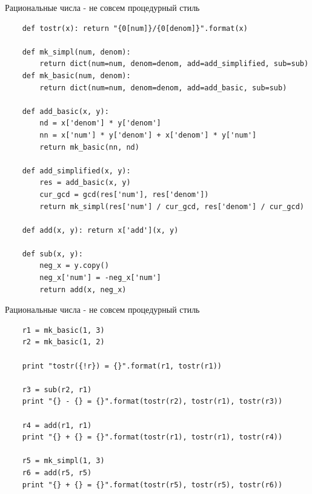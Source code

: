 \documentclass{article}
\begin{document}
\begin{center} Рациональные числа - не совсем процедурный стиль \end{center}
\begin{lstlisting}
    def tostr(x): return "{0[num]}/{0[denom]}".format(x)

    def mk_simpl(num, denom):
        return dict(num=num, denom=denom, add=add_simplified, sub=sub)
    def mk_basic(num, denom):
        return dict(num=num, denom=denom, add=add_basic, sub=sub)

    def add_basic(x, y):
        nd = x['denom'] * y['denom']
        nn = x['num'] * y['denom'] + x['denom'] * y['num']
        return mk_basic(nn, nd)

    def add_simplified(x, y):
        res = add_basic(x, y)
        cur_gcd = gcd(res['num'], res['denom'])
        return mk_simpl(res['num'] / cur_gcd, res['denom'] / cur_gcd)

    def add(x, y): return x['add'](x, y)

    def sub(x, y):
        neg_x = y.copy()
        neg_x['num'] = -neg_x['num']
        return add(x, neg_x)
\end{lstlisting}
\newpage

\begin{center} Рациональные числа - не совсем процедурный стиль \end{center}
\begin{lstlisting}
    r1 = mk_basic(1, 3)
    r2 = mk_basic(1, 2)

    print "tostr({!r}) = {}".format(r1, tostr(r1))

    r3 = sub(r2, r1)
    print "{} - {} = {}".format(tostr(r2), tostr(r1), tostr(r3))

    r4 = add(r1, r1)
    print "{} + {} = {}".format(tostr(r1), tostr(r1), tostr(r4))

    r5 = mk_simpl(1, 3)
    r6 = add(r5, r5)
    print "{} + {} = {}".format(tostr(r5), tostr(r5), tostr(r6))
\end{lstlisting}
\newpage
\end{document}
